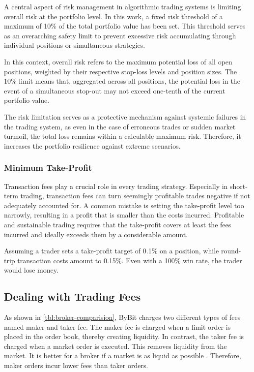 A central aspect of risk management in algorithmic trading systems is limiting overall risk at the portfolio level.
In this work, a fixed risk threshold of a maximum of 10\% of the total portfolio value has been set.
This threshold serves as an overarching safety limit to prevent excessive risk accumulating through individual positions or simultaneous strategies.

In this context, overall risk refers to the maximum potential loss of all open positions, weighted by their respective stop-loss levels and position sizes.
The 10\% limit means that, aggregated across all positions, the potential loss in the event of a simultaneous stop-out may not exceed one-tenth of the current portfolio value.

The risk limitation serves as a protective mechanism against systemic failures in the trading system, as even in the case of erroneous trades or sudden market turmoil, the total loss remains within a calculable maximum risk.
Therefore, it increases the portfolio resilience against extreme scenarios.

\subsubsection{Minimum Take-Profit}

Transaction fees play a crucial role in every trading strategy.
Especially in short-term trading, transaction fees can turn seemingly profitable trades negative if not adequately accounted for.
A common mistake is setting the take-profit level too narrowly, resulting in a profit that is smaller than the costs incurred.
Profitable and sustainable trading requires that the take-profit covers at least the fees incurred and ideally exceeds them by a considerable amount.

Assuming a trader sets a take-profit target of 0.1\% on a position, while round-trip transaction costs amount to 0.15\%.
Even with a 100\% win rate, the trader would lose money.

\subsection{Dealing with Trading Fees}
\label{chap:dealing-with-trading-fees}

As shown in \autoref{tbl:broker-comparision}, ByBit charges two different types of fees named maker and taker fee.
The maker fee is charged when a limit order is placed in the order book, thereby creating liquidity.
In contrast, the taker fee is charged when a market order is executed.
This removes liquidity from the market.
It is better for a broker if a market is as liquid as possible \cite{liquid-markets}.
Therefore, maker orders incur lower fees than taker orders.

